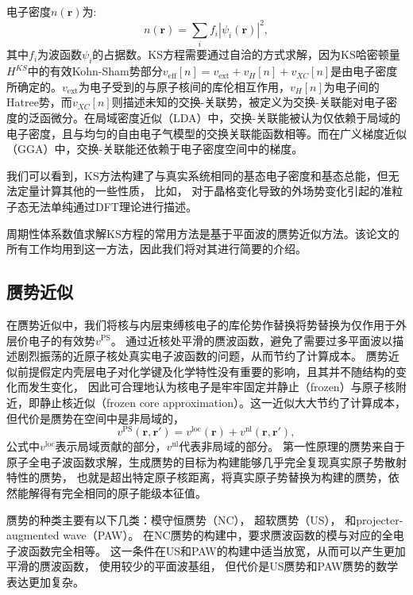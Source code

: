 电子密度$n(\bm{r})$为:
\begin{equation}
  n(\bm{r}) = \sum_i f_i |\psi_i(\bm{r})|^2 ,
\end{equation}
其中$f_i$为波函数$\psi_i$的占据数。KS方程需要通过自洽的方式求解，因为KS哈密顿量$H^{KS}$中的有效Kohn-Sham势部分$v_{\mathrm{eff}}[n]=v_{\mathrm{ext}} + v_{H}[n] + v_{XC}[n]$是由电子密度所确定的。$v_{\mathrm{ext}}$为电子受到的与原子核间的库伦相互作用，$v_{H}[n]$为电子间的Hatree势，而$v_{XC}[n]$则描述未知的交换-关联势，被定义为交换-关联能对电子密度的泛函微分。在局域密度近似（LDA）中，交换-关联能被认为仅依赖于局域的电子密度，且与均匀的自由电子气模型的交换关联能函数相等。而在广义梯度近似（GGA）中，交换-关联能还依赖于电子密度空间中的梯度。

我们可以看到，KS方法构建了与真实系统相同的基态电子密度和基态总能，但无法定量计算其他的一些性质，
比如，
对于晶格变化导致的外场势变化引起的准粒子态无法单纯通过DFT理论进行描述。

周期性体系数值求解KS方程的常用方法是基于平面波的赝势近似方法。该论文的所有工作均用到这一方法，因此我们将对其进行简要的介绍。

\subsection{赝势近似}
在赝势近似中，我们将核与内层束缚核电子的库伦势作替换将势替换为仅作用于外层价电子的有效势$v^\mathrm{PS}$。
通过近核处平滑的赝波函数，避免了需要过多平面波以描述剧烈振荡的近原子核处真实电子波函数的问题，从而节约了计算成本。
赝势近似前提假定内壳层电子对化学键及化学特性没有重要的影响，且其并不随结构的变化而发生变化，
因此可合理地认为核电子是牢牢固定并静止（frozen）与原子核附近，即静止核近似（frozen core approximation）。这一近似大大节约了计算成本，但代价是赝势在空间中是非局域的，
\begin{equation}
  v^{\mathrm{PS}}(\bm{r},\bm{r'}) = v^{\mathrm{loc}}(\bm{r}) + v^{\mathrm{nl}}(\bm{r},\bm{r'}) ,
\end{equation}
公式中$v^\mathrm{loc}$表示局域贡献的部分，$v^\mathrm{nl}$代表非局域的部分。
第一性原理的赝势来自于原子全电子波函数求解，生成赝势的目标为构建能够几乎完全复现真实原子势散射特性的赝势，
也就是超出特定原子核距离，将真实原子势替换为构建的赝势，依然能解得有完全相同的原子能级本征值。

赝势的种类主要有以下几类：模守恒赝势（NC）\cite{hamann1979norm}，
超软赝势（US）\cite{vanderbilt1990soft}，
和projecter-augmented wave（PAW）\cite{blochl1994projector}。 
在NC赝势的构建中，要求赝波函数的模与对应的全电子波函数完全相等。
这一条件在US和PAW的构建中适当放宽，从而可以产生更加平滑的赝波函数，
使用较少的平面波基组，
但代价是US赝势和PAW赝势的数学表达更加复杂。

